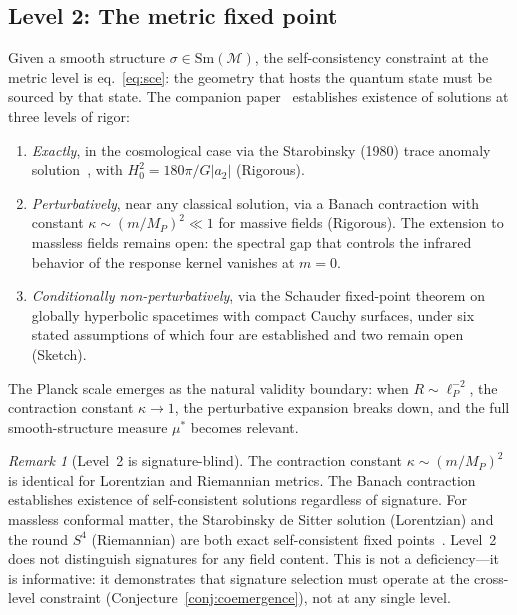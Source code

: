 \documentclass[12pt,a4paper]{article}
\theoremstyle{definition}
\theoremstyle{remark}
\newtheorem{remark}{Remark}
\begin{document}
\subsection{Level 2: The metric fixed point}
\label{sec:level2}

Given a smooth structure $\sigma \in \mathrm{Sm}(\mathcal{M})$, the
self-consistency constraint at the metric level is
eq.~\eqref{eq:sce}: the geometry that hosts the quantum state must be
sourced by that state. The companion paper~\cite{fixed_point} establishes
existence of solutions at three levels of rigor:

\begin{enumerate}

\item \emph{Exactly}, in the cosmological case via the Starobinsky
(1980) trace anomaly solution~\cite{starobinsky}, with
$H_0^2 = 180\pi/G|a_2|$ (Rigorous).

\item \emph{Perturbatively}, near any classical solution, via a Banach
contraction with constant $\kappa \sim (m/M_P)^2 \ll 1$ for massive
fields (Rigorous). The extension to massless fields remains open: the
spectral gap that controls the infrared behavior of the response kernel
vanishes at $m = 0$.

\item \emph{Conditionally non-perturbatively}, via the Schauder
fixed-point theorem on globally hyperbolic spacetimes with compact Cauchy
surfaces, under six stated assumptions of which four are established and
two remain open (Sketch).

\end{enumerate}

The Planck scale emerges as the natural validity boundary: when
$R \sim \ell_P^{-2}$, the contraction constant $\kappa \to 1$, the
perturbative expansion breaks down, and the full smooth-structure measure
$\mu^*$ becomes relevant.

\begin{remark}[Level~2 is signature-blind]
\label{rem:signature_blind}
The contraction constant $\kappa \sim (m/M_P)^2$ is identical for
Lorentzian and Riemannian metrics. The Banach contraction establishes
existence of self-consistent solutions regardless of signature. For
massless conformal matter, the Starobinsky de Sitter solution
(Lorentzian) and the round $S^4$ (Riemannian) are both exact
self-consistent fixed points~\cite{starobinsky,bunch_davies}. Level~2
does not distinguish signatures for any field content. This is not a
deficiency---it is informative: it demonstrates that signature selection
must operate at the cross-level constraint
(Conjecture~\ref{conj:coemergence}), not at any single level.
\end{remark}
\end{document}
